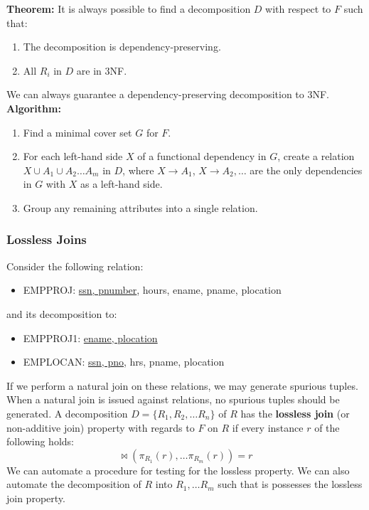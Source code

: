 \documentclass[a4paper,11pt]{article}
\begin{document}
\textbf{Theorem:}
It is always possible to find a decomposition $D$ with respect to $F$ such that: 
\begin{enumerate}
    \item   The decomposition is dependency-preserving.
    \item   All $R_i$ in $D$ are in 3NF.
\end{enumerate}

We can always guarantee a dependency-preserving decomposition to 3NF. 
\textbf{Algorithm:}
\begin{enumerate}
    \item   Find a minimal cover set $G$ for $F$.
    \item   For each left-hand side $X$ of a functional dependency in $G$, create a relation
            $X \cup A_1 \cup A_2 \dots A_m$ in $D$, where $X \rightarrow A_1$, $X \rightarrow A_2, \dots$ are the only 
            dependencies in $G$ with $X$ as a left-hand side.
    \item   Group any remaining attributes into a single relation.
\end{enumerate}

\subsubsection{Lossless Joins}
Consider the following relation:
\begin{itemize}
    \item   EMPPROJ: \underline{ssn, pnumber}, hours, ename, pname, plocation
\end{itemize}
and its decomposition to:
\begin{itemize}
    \item   EMPPROJ1: \underline{ename, plocation}
    \item   EMPLOCAN: \underline{ssn, pno}, hrs, pname, plocation
\end{itemize}
If we perform a natural join on these relations, we may generate spurious tuples.
When a natural join is issued against relations, no spurious tuples should be generated.
A decomposition $D = \{R_1, R_2, \dots R_n\}$ of $R$ has the \textbf{lossless join} (or non-additive join) property with
regards to $F$ on $R$ if every instance $r$ of the following holds:
$$ \bowtie (\pi_{R_1}(r), \dots \pi_{R_m}(r)) = r $$
We can automate a procedure for testing for the lossless property. 
We can also automate the decomposition of $R$ into $R_1, \dots R_m$ such that is possesses the lossless join property.
\\\\
\end{document}
